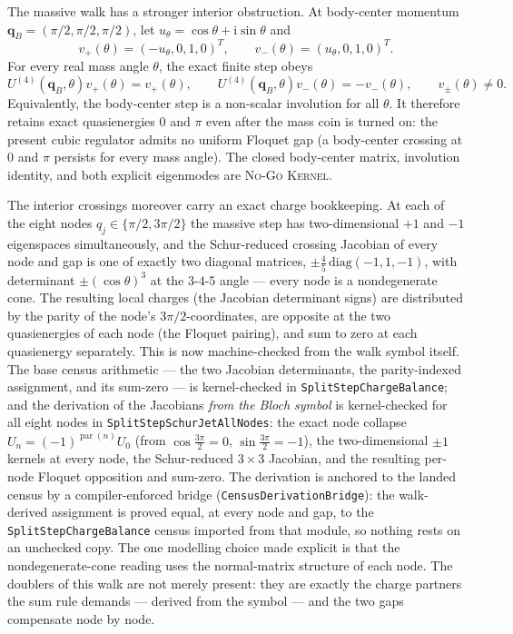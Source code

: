 \documentclass[11pt]{article}
\newcommand{\Kernel}{\textcolor{kernelcolor}{\textsc{Kernel}}}
\newcommand{\NoGo}{\textsc{No-Go}}
\newcommand{\ii}{\mathrm{i}}
\begin{document}
The massive walk has a stronger interior obstruction.  At body-center momentum
$\mathbf q_B=(\pi/2,\pi/2,\pi/2)$, let
$u_\theta=\cos\theta+\ii\sin\theta$ and
\[
 v_+(\theta)=(-u_\theta,0,1,0)^T,
 \qquad
 v_-(\theta)=(u_\theta,0,1,0)^T.
\]
For every real mass angle $\theta$, the exact finite step obeys
\begin{equation}\label{eq:bodycentermodes}
 U^{(4)}(\mathbf q_B,\theta)v_+(\theta)=v_+(\theta),
 \qquad
 U^{(4)}(\mathbf q_B,\theta)v_-(\theta)=-v_-(\theta),
 \qquad v_\pm(\theta)\neq0.
\end{equation}
Equivalently, the body-center step is a non-scalar involution for all
$\theta$.  It therefore retains exact quasienergies $0$ and $\pi$ even after
the mass coin is turned on: the present cubic regulator admits no uniform
Floquet gap (a body-center crossing at $0$ and $\pi$ persists for every
mass angle).
The closed body-center matrix, involution identity, and both explicit
eigenmodes are \NoGo{} \Kernel{}.

The interior crossings moreover carry an exact charge bookkeeping.  At
each of the eight nodes $q_j\in\{\pi/2,3\pi/2\}$ the massive step has
two-dimensional $+1$ and $-1$ eigenspaces simultaneously, and the
Schur-reduced crossing Jacobian of every node and gap is one of exactly
two diagonal matrices, $\pm\tfrac45\,\mathrm{diag}(-1,1,-1)$, with
determinant $\pm(\cos\theta)^3$ at the $3$-$4$-$5$ angle --- every node
is a nondegenerate cone.  The resulting local charges (the Jacobian
determinant signs) are distributed by the parity of the node's
$3\pi/2$-coordinates, are opposite at the two quasienergies of each
node (the Floquet pairing), and sum to zero at each quasienergy
separately.  This is now machine-checked from the walk symbol itself.
The base census arithmetic --- the two Jacobian determinants, the
parity-indexed assignment, and its sum-zero --- is kernel-checked in
\texttt{SplitStepChargeBalance}; and the derivation of the Jacobians
\emph{from the Bloch symbol} is kernel-checked for all eight nodes in
\texttt{SplitStepSchurJetAllNodes}: the exact node collapse
$U_n=(-1)^{\operatorname{par}(n)}U_0$ (from $\cos\tfrac{3\pi}{2}=0$,
$\sin\tfrac{3\pi}{2}=-1$), the two-dimensional $\pm1$ kernels at every
node, the Schur-reduced $3\times3$ Jacobian, and the resulting per-node
Floquet opposition and sum-zero.  The derivation is anchored to the
landed census by a compiler-enforced bridge
(\texttt{CensusDerivationBridge}): the walk-derived assignment is proved
equal, at every node and gap, to the \texttt{SplitStepChargeBalance}
census imported from that module, so nothing rests on an unchecked copy.
The one modelling choice made explicit is that the nondegenerate-cone
reading uses the normal-matrix structure of each node.  The doublers of this walk are
not merely present: they are exactly the charge partners the sum rule
demands --- derived from the symbol --- and the two gaps compensate node
by node.
\end{document}
